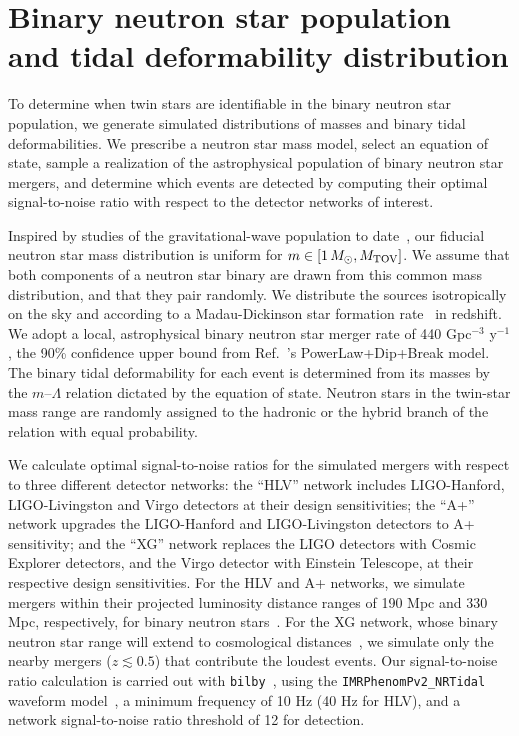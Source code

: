 \documentclass[aps,prd,twocolumn,superscriptaddress,nofootinbib]{revtex4-1}
\newcommand{\Msun}{\ensuremath{\,M_{\odot}}}
\begin{document}
\section{Binary neutron star population and tidal deformability distribution}\label{Sec_BNSPop}
To determine when twin stars are identifiable in the binary neutron star population, we generate simulated distributions of masses and binary tidal deformabilities. We prescribe a neutron star mass model, select an equation of state, sample a realization of the astrophysical population of binary neutron star mergers, and determine which events are detected by computing their optimal signal-to-noise ratio with respect to the detector networks of interest.

Inspired by studies of the gravitational-wave population to date~\cite{LandryRead2021,LVK_O3bPop}, our fiducial neutron star mass distribution is uniform for $m \in [1\Msun,M_{\rm TOV}]$. 
We assume that both components of a neutron star binary are drawn from this common mass distribution, and that they pair randomly.
We distribute the sources isotropically on the sky and according to a Madau-Dickinson star formation rate~\cite{MadauDickinson2014} in redshift. 
We adopt a local, astrophysical binary neutron star merger rate of 440 Gpc$^{-3}$ y$^{-1}$, the 90\% confidence upper bound from Ref.~\cite{LVK_O3bPop}'s PowerLaw+Dip+Break model.
The binary tidal deformability for each event is determined from its masses by the $m$--$\Lambda$ relation dictated by the equation of state. Neutron stars in the twin-star mass range are randomly assigned to the hadronic or the hybrid branch of the relation with equal probability. 

We calculate optimal signal-to-noise ratios for the simulated mergers with respect to three different detector networks: the ``HLV'' network includes LIGO-Hanford, LIGO-Livingston and Virgo detectors at their design sensitivities; the ``A+'' network upgrades the LIGO-Hanford and LIGO-Livingston detectors to A+ sensitivity; and the ``XG'' network replaces the LIGO detectors with Cosmic Explorer detectors, and the Virgo detector with Einstein Telescope, at their respective design sensitivities. For the HLV and A+ networks, we simulate mergers within their projected luminosity distance ranges of 190 Mpc and 330 Mpc, respectively, for binary neutron stars~\cite{AbbottAbbott2018_ObservingScenarios}. 
For the XG network, whose binary neutron star range will extend to cosmological distances~\cite{EvansAdhikari2021,BorhanianSathyaprakash2022}, we simulate only the nearby mergers ($z \lesssim 0.5$) that contribute the loudest events. Our signal-to-noise ratio calculation is carried out with \texttt{bilby}~\cite{AshtonHubner2019}, using the \texttt{IMRPhenomPv2\_NRTidal} waveform model~\cite{DietrichKhan2019}, a minimum frequency of 10 Hz (40 Hz for HLV), and a network signal-to-noise ratio threshold of 12 for detection.
\end{document}

